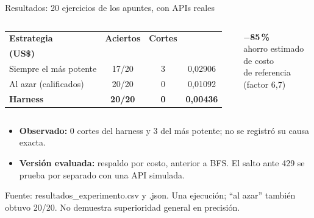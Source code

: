 \documentclass[aspectratio=169,11pt]{beamer}
\newcommand{\expone}{}
\begin{document}
\renewcommand{\expone}{Manuel Hormechea}
\begin{frame}{Resultados: 20 ejercicios de los apuntes, con APIs reales}
\begin{columns}[c]
\renewcommand{\arraystretch}{1.3}\small
\begin{tabular}{@{}lccc@{}}
\toprule
\textbf{Estrategia} & \textbf{Aciertos} & \textbf{Cortes} & \shortstack{\textbf{Costo ref.}\\\textbf{(US\$)}} \\
\midrule
Siempre el más potente & 17/20 & 3 & 0,02906 \\
Al azar (calificados) & 20/20 & 0 & 0,01092 \\
\textbf{\color{rojo}Harness} & \textbf{20/20} & \textbf{0} & \textbf{0,00436} \\
\bottomrule
\end{tabular}
\centering
{\fontsize{30}{34}\selectfont\bfseries\color{rojo}$-$85\,\%}\\[0.15cm]
{\footnotesize ahorro estimado de costo\\de referencia (factor 6,7)}
\end{columns}
\vspace{0.4cm}
\begin{itemize}
  \item \textbf{Observado:} 0 cortes del harness y 3 del más potente; no se registró su causa exacta.
  \item \textbf{Versión evaluada:} respaldo por costo, anterior a BFS. El salto ante 429 se prueba por separado con una API simulada.
\end{itemize}
\vspace{0.1cm}
{\scriptsize\color{gray} Fuente: resultados\_experimento.csv y .json. Una ejecución; \enquote{al azar} también obtuvo 20/20. No demuestra superioridad general en precisión.}
\end{frame}
\end{document}
